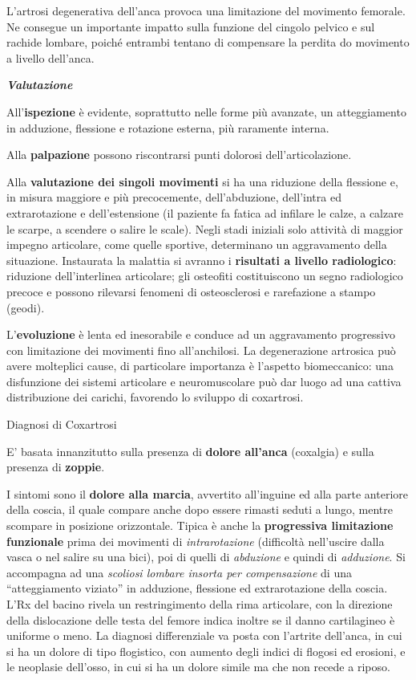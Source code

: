 \documentclass[]{article}
\begin{document}
L'artrosi degenerativa dell'anca provoca una limitazione del movimento
femorale. Ne consegue un importante impatto sulla funzione del cingolo
pelvico e sul rachide lombare, poiché entrambi tentano di compensare la
perdita do movimento a livello dell'anca.

\textbf{\emph{Valutazione}}

All'\textbf{ispezione} è evidente, soprattutto nelle forme più avanzate,
un atteggiamento in adduzione, flessione e rotazione esterna, più
raramente interna.

Alla \textbf{palpazione} possono riscontrarsi punti dolorosi
dell'articolazione.

Alla \textbf{valutazione dei singoli movimenti} si ha una riduzione
della flessione e, in misura maggiore e più precocemente,
dell'abduzione, dell'intra ed extrarotazione e dell'estensione (il
paziente fa fatica ad infilare le calze, a calzare le scarpe, a scendere
o salire le scale). Negli stadi iniziali solo attività di maggior
impegno articolare, come quelle sportive, determinano un aggravamento
della situazione. Instaurata la malattia si avranno i \textbf{risultati
a livello radiologico}: riduzione dell'interlinea articolare; gli
osteofiti costituiscono un segno radiologico precoce e possono rilevarsi
fenomeni di osteosclerosi e rarefazione a stampo (geodi).

L'\textbf{evoluzione} è lenta ed inesorabile e conduce ad un
aggravamento progressivo con limitazione dei movimenti fino
all'anchilosi. La degenerazione artrosica può avere molteplici cause, di
particolare importanza è l'aspetto biomeccanico: una disfunzione dei
sistemi articolare e neuromuscolare può dar luogo ad una cattiva
distribuzione dei carichi, favorendo lo sviluppo di coxartrosi.

Diagnosi di Coxartrosi

E' basata innanzitutto sulla presenza di \textbf{dolore all'anca}
(coxalgia) e sulla presenza di \textbf{zoppie}.

I sintomi sono il \textbf{dolore alla marcia}, avvertito all'inguine ed
alla parte anteriore della coscia, il quale compare anche dopo essere
rimasti seduti a lungo, mentre scompare in posizione orizzontale. Tipica
è anche la \textbf{progressiva limitazione funzionale} prima dei
movimenti di \emph{intrarotazione} (difficoltà nell'uscire dalla vasca o
nel salire su una bici), poi di quelli di \emph{abduzione} e quindi di
\emph{adduzione}. Si accompagna ad una \emph{scoliosi lombare insorta
per compensazione} di una ``atteggiamento viziato'' in adduzione,
flessione ed extrarotazione della coscia. L'Rx del bacino rivela un
restringimento della rima articolare, con la direzione della
dislocazione delle testa del femore indica inoltre se il danno
cartilagineo è uniforme o meno. La diagnosi differenziale va posta con
l'artrite dell'anca, in cui si ha un dolore di tipo flogistico, con
aumento degli indici di flogosi ed erosioni, e le neoplasie dell'osso,
in cui si ha un dolore simile ma che non recede a riposo.
\end{document}
